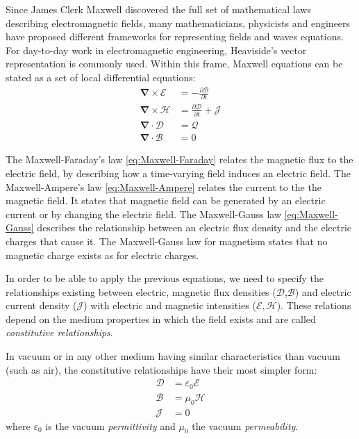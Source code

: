 Since James Clerk Maxwell discovered the full set of mathematical laws describing electromagnetic fields, many mathematicians, physicists and engineers have proposed different frameworks for representing fields and waves equations\parencite{Lindell2004, Warnick2014}.   
For day-to-day work in electromagnetic engineering, Heaviside's vector representation is commonly used. Within this frame,  Maxwell equations can be stated as a set of local differential equations:
\begin{subequations}
 \begin{align}
  \boldsymbol{\nabla} \times \boldsymbol{\mathcal{E}} &= -\frac{\partial \boldsymbol{\mathcal{B}}}{\partial t} \label{eq:Maxwell-Faraday}\\
  \boldsymbol{\nabla} \times \boldsymbol{\mathcal{H}} &= \frac{\partial \boldsymbol{\mathcal{D}}}{\partial t} + \boldsymbol{\mathcal{J}} \label{eq:Maxwell-Ampere} \\
  \boldsymbol{\nabla} \cdot \boldsymbol{\mathcal{D}} &= \mathcal{Q} \label{eq:Maxwell-Gauss} \\
  \boldsymbol{\nabla} \cdot \boldsymbol{\mathcal{B}} &= 0 \label{eq:Maxwell-Gauss-Magnetism}
 \end{align}
\end{subequations} 

The Maxwell-Faraday's law \ref{eq:Maxwell-Faraday} relates the magnetic flux to the electric field, by describing how a time-varying field induces an electric field.
The Maxwell-Ampere's law \ref{eq:Maxwell-Ampere} relates the current to the the magnetic field. It states that magnetic field can be generated by an electric current or by changing the electric field. The Maxwell-Gauss law \ref{eq:Maxwell-Gauss} describes the relationship between an electric flux density and the electric charges that cause it. The Maxwell-Gauss law for magnetism states that no magnetic charge exists as for electric charges.

In order to be able to apply the previous equations, we need to specify the relationships existing between electric, magnetic flux densities ($\mathcal{D}$,$\mathcal{B}$) and electric current density ($\mathcal{J}$) with electric and magnetic intensities ($\mathcal{E},\mathcal{H}$). These relations depend on the medium properties in which the field exists and are called \emph{constitutive relationships}. 

In vacuum or in any other medium having similar characteristics than vacuum (such as air), the constitutive relationships have their most simpler form:
\begin{subequations}
 \begin{align}
  \boldsymbol{\mathcal{D}} &= \varepsilon_0 \boldsymbol{\mathcal{E}} \\
  \boldsymbol{\mathcal{B}} &= \mu_0 \boldsymbol{\mathcal{H}} \\
  \boldsymbol{\mathcal{J}} &= 0
 \end{align}
\end{subequations}
where $\varepsilon_0$ is the vacuum \emph{permittivity} and $\mu_0$ the vacuum \emph{permeability}. 

